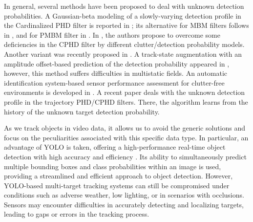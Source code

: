 In general, several methods have been proposed to deal with unknown detection probabilities. A Gaussian-beta modeling of a slowly-varying detection profile in the Cardinalized PHD filter is reported in \cite{Mahler2011cphd}; its alternative for MBM filters follows in \cite{Vo2013Robust}, and for PMBM filter in \cite{Kong2021Robust}. In \cite{Li2018PHD}, the authors propose to overcome some deficiencies in the CPHD filter \cite{Mahler2011cphd} by different clutter/detection probability models. Another variant was recently proposed in \cite{wei2023BGMPHD}. A track-state augmentation with \linebreak an amplitude offset-based prediction of the detection probability appeared in \cite{Hanusa2013Track}, however, this method suffers difficulties in multistatic fields. An automatic identification system-based sensor performance assessment for clutter-free environments is developed in \cite{Horn2013Near}. A recent paper \cite{Wei2022Trajectory} deals with the unknown detection profile in the trajectory PHD/CPHD filters. There, the algorithm learns from the history of the unknown target detection probability.

As we track objects in video data, it allows us to avoid the generic solutions and focus on the peculiarities
associated with this specific data type. In particular, an advantage of YOLO is taken, offering a high-performance
real-time object detection with high accuracy and efficiency \cite{yanYolo2023}. Its ability to simultaneously
predict multiple bounding boxes and class probabilities within an image is used, providing a streamlined and
efficient approach to object detection. However, YOLO-based multi-target tracking systems can still be compromised
under conditions such as adverse weather, low lighting, or in scenarios with occlusions. Sensors may encounter difficulties in accurately detecting and localizing targets, leading to gaps or errors in the tracking process.

